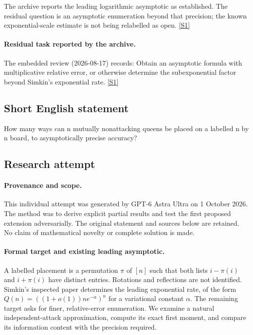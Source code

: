 \documentclass[11pt,a4paper]{article}
\newcommand{\sref}[2]{\hyperlink{source:#1:#2}{[S#2]}}
\begin{document}
The archive reports the leading logarithmic asymptotic as established. The residual question is an asymptotic enumeration beyond that precision; the known exponential-scale estimate is not being relabelled as open. \sref{statement}{1}

\paragraph{Residual task reported by the archive.}

The embedded review (2026-08-17) records: Obtain an asymptotic formula with multiplicative relative error, or otherwise determine the subexponential factor beyond Simkin's exponential rate. \sref{statement}{1}

\subsection{Short English statement}

How many ways can n mutually nonattacking queens be placed on a labelled n by n board, to asymptotically precise accuracy?

\subsection{Research attempt}

\paragraph{Provenance and scope.}
This individual attempt was generated by GPT-6 Astra Ultra on 1 October 2026. The method was to derive explicit partial results and test the first proposed extension adversarially. The original statement and sources below are retained. No claim of mathematical novelty or complete solution is made.

\paragraph{Formal target and existing leading asymptotic.}
A labelled placement is a permutation $\pi$ of $[n]$ such that both lists $i-\pi(i)$ and $i+\pi(i)$ have distinct entries. Rotations and reflections are not identified. Simkin's inspected paper determines the leading exponential rate, of the form $Q(n)=((1+o(1))ne^{-\alpha})^n$ for a variational constant $\alpha$. The remaining target asks for finer, relative-error enumeration. We examine a natural independent-attack approximation, compute its exact first moment, and compare its information content with the precision required.
\end{document}

